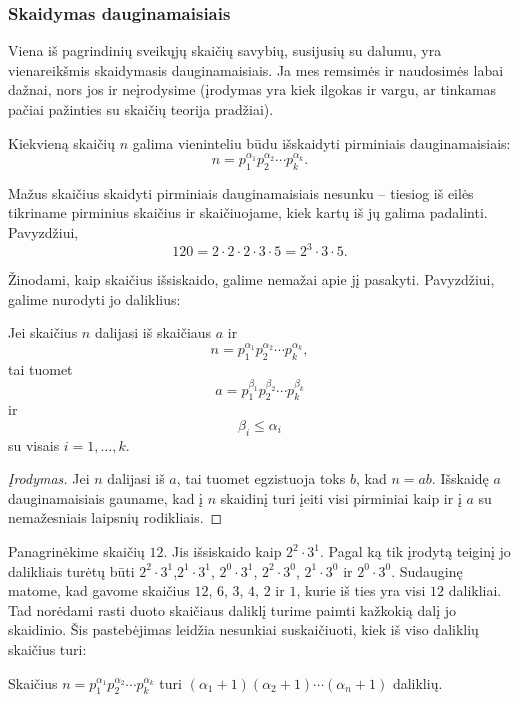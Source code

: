 \subsubsection{Skaidymas dauginamaisiais}
Viena iš pagrindinių sveikųjų skaičių savybių, susijusių su dalumu, yra
vienareikšmis skaidymasis dauginamaisiais. Ja mes remsimės ir naudosimės
labai dažnai, nors jos ir neįrodysime (įrodymas yra kiek ilgokas ir vargu,
ar tinkamas pačiai pažinties su skaičių teorija pradžiai).

\begin{teig} 
  Kiekvieną skaičių $n$ galima vieninteliu būdu išskaidyti
  pirminiais dauginamaisiais: $$n=p_1^{\alpha_1}p_2^{\alpha_2}\cdots
  p_k^{\alpha_k}.$$ 
\end{teig}

Mažus skaičius skaidyti pirminiais dauginamaisiais nesunku -- tiesiog iš eilės tikriname
pirminius skaičius ir skaičiuojame, kiek kartų iš jų galima padalinti.
Pavyzdžiui, $$120 = 2\cdot 2 \cdot 2 \cdot 3 \cdot 5 = 2^3\cdot 3 \cdot 5.$$

Žinodami, kaip skaičius išsiskaido, galime nemažai apie jį pasakyti.
Pavyzdžiui, galime nurodyti jo daliklius:

\begin{teig} Jei skaičius $n$ dalijasi iš skaičiaus $a$ ir
  $$n=p_1^{\alpha_1}p_2^{\alpha_2}\cdots p_k^{\alpha_k},$$ tai tuomet
  $$a=p_1^{\beta_1}p_2^{\beta_2}\cdots p_k^{\beta_k}$$ ir $$\beta_i \leq
  \alpha_i$$ su visais $i=1,\dots,k$.  
\end{teig}

\begin{proof}[Įrodymas] Jei $n$ dalijasi iš $a$, tai tuomet egzistuoja toks $b$,
  kad $n=ab$. Išskaidę $a$ dauginamaisiais gauname, kad į $n$ skaidinį turi 
  įeiti visi pirminiai kaip ir į $a$ su nemažesniais laipsnių rodikliais.
\end{proof}

Panagrinėkime skaičių $12$. Jis išsiskaido kaip $2^2\cdot 3^1$. Pagal ką
tik įrodytą teiginį jo dalikliais turėtų būti $2^2 \cdot 3^1$,$2^1 \cdot
3^1$, $2^0 \cdot 3^1$, $2^2 \cdot 3^0$, $2^1 \cdot 3^0$ ir $2^0 \cdot 3^0$.
Sudauginę matome, kad gavome skaičius $12$, $6$, $3$, $4$, $2$ ir $1$,
kurie iš ties yra visi $12$ dalikliai. 
Tad norėdami rasti duoto skaičiaus daliklį turime paimti kažkokią dalį jo
skaidinio. Šis pastebėjimas leidžia nesunkiai suskaičiuoti, kiek iš viso
daliklių skaičius turi:

\begin{teig} Skaičius $n = p_1^{\alpha_1}p_2^{\alpha_2}\cdots
  p_k^{\alpha_k}$ turi $(\alpha_1 + 1)(\alpha_2 + 1)\cdots (\alpha_n + 1)$
  daliklių.  
\end{teig}

